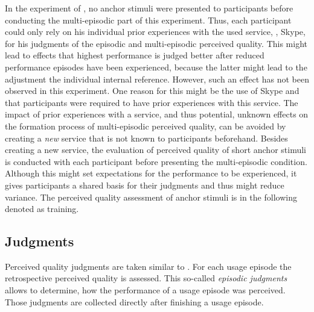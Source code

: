 In the experiment of \citet{moller_single-call_2011}, no anchor stimuli were presented to participants before conducting the multi-episodic part of this experiment.
Thus, each participant could only rely on his individual prior experiences with the used service, \ie, Skype, for his judgments of the episodic and multi-episodic perceived quality.
This might lead to effects that highest performance is judged better after reduced performance episodes have been experienced, because the latter might lead to the adjustment the individual internal reference.
However, such an effect has not been observed in this experiment.
One reason for this might be the use of Skype and that participants were required to have prior experiences with this service.
The impact of prior experiences with a service, and thus potential, unknown effects on the formation process of multi-episodic perceived quality, can be avoided by creating a \emph{new} service that is not known to participants beforehand.
Besides creating a new service, the evaluation of perceived quality of short anchor stimuli is conducted with each participant before presenting the multi-episodic condition.
Although this might set expectations for the performance to be experienced, it gives participants a shared basis for their judgments and thus might reduce variance.
The perceived quality assessment of anchor stimuli is in the following denoted as training.


\subsection{Judgments}
Perceived quality judgments are taken similar to \citet{moller_single-call_2011}.
For each usage episode the retrospective perceived quality is assessed.
This so-called \emph{episodic judgments} allows to determine, how the performance of a usage episode was perceived.
Those judgments are collected directly after finishing a usage episode.

